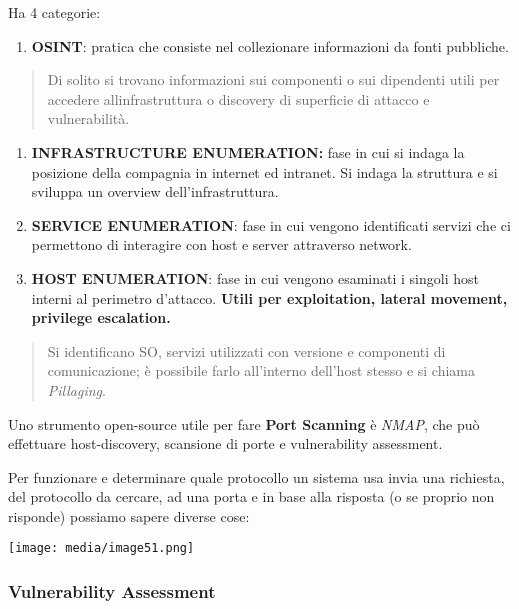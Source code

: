 Ha 4 categorie:

\begin{enumerate}
\def\labelenumi{\arabic{enumi}.}
\item
  \textbf{OSINT}: pratica che consiste nel collezionare informazioni da
  fonti pubbliche.
\end{enumerate}

\begin{quote}
Di solito si trovano informazioni sui componenti o sui dipendenti utili
per accedere all\textquotesingle infrastruttura o discovery di
superficie di attacco e vulnerabilità.
\end{quote}

\begin{enumerate}
\def\labelenumi{\arabic{enumi}.}
\setcounter{enumi}{1}
\item
  \textbf{INFRASTRUCTURE ENUMERATION:} fase in cui si indaga la
  posizione della compagnia in internet ed intranet. Si indaga la
  struttura e si sviluppa un overview dell'infrastruttura.
\item
  \textbf{SERVICE ENUMERATION}: fase in cui vengono identificati servizi
  che ci permettono di interagire con host e server attraverso network.
\item
  \textbf{HOST ENUMERATION}: fase in cui vengono esaminati i singoli
  host interni al perimetro d'attacco. \textbf{Utili per exploitation,
  lateral movement, privilege escalation.}
\end{enumerate}

\begin{quote}
Si identificano SO, servizi utilizzati con versione e componenti di
comunicazione; è possibile farlo all'interno dell'host stesso e si
chiama \emph{Pillaging}.
\end{quote}

Uno strumento open-source utile per fare \textbf{Port Scanning} è
\emph{NMAP}, che può effettuare host-discovery, scansione di porte e
vulnerability assessment.

Per funzionare e determinare quale protocollo un sistema usa invia una
richiesta, del protocollo da cercare, ad una porta e in base alla
risposta (o se proprio non risponde) possiamo sapere diverse cose:

\texttt{[image: media/image51.png]}

\subsubsection{Vulnerability
Assessment}\label{vulnerability-assessment-1}

